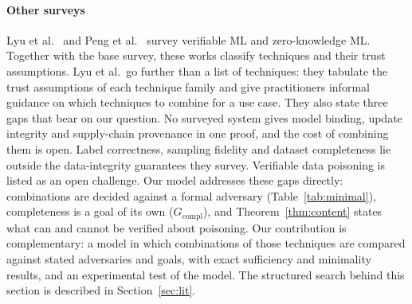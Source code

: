 \paragraph{Other surveys}
Lyu et al.~\cite{lyu2026survey} and Peng et al.~\cite{peng2026zkp} survey verifiable ML and
zero-knowledge ML. Together with the base survey, these works classify techniques and their
trust assumptions. Lyu et al.\ go further than a list of techniques: they tabulate the trust
assumptions of each technique family and give practitioners informal guidance on which
techniques to combine for a use case. They also state three gaps that bear on our question.
No surveyed system gives model binding, update integrity and supply-chain provenance in one
proof, and the cost of combining them is open. Label correctness, sampling fidelity and
dataset completeness lie outside the data-integrity guarantees they survey. Verifiable data
poisoning is listed as an open challenge. Our model addresses these gaps directly: combinations
are decided against a formal adversary (Table~\ref{tab:minimal}), completeness is a goal of its
own ($G_{\mathrm{compl}}$), and Theorem~\ref{thm:content} states what can and cannot be
verified about poisoning. Our contribution is complementary: a model in which combinations of those
techniques are compared against stated adversaries and goals, with exact sufficiency and
minimality results, and an experimental test of the model. The structured search behind this
section is described in Section~\ref{sec:lit}.
